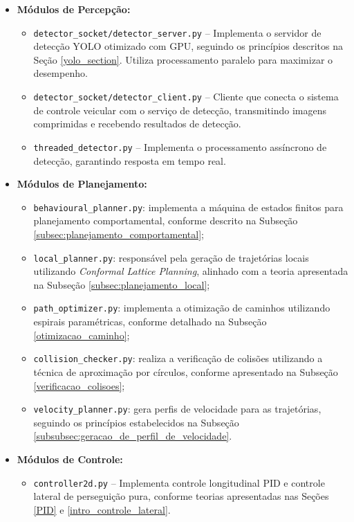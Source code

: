 \begin{itemize}
    \item \textbf{Módulos de Percepção:}
    \begin{itemize}
        \item \texttt{detector\_socket/detector\_server.py} – Implementa o servidor de detecção YOLO otimizado com GPU, seguindo os princípios descritos na Seção \ref{yolo_section}. Utiliza processamento paralelo para maximizar o desempenho.
        
        \item \texttt{detector\_socket/detector\_client.py} – Cliente que conecta o sistema de controle veicular com o serviço de detecção, transmitindo imagens comprimidas e recebendo resultados de detecção.
        
        \item \texttt{threaded\_detector.py} – Implementa o processamento assíncrono de detecção, garantindo resposta em tempo real.
    \end{itemize}
    
    \item \textbf{Módulos de Planejamento:}
    \begin{itemize}
        \item \texttt{behavioural\_planner.py}: implementa a máquina de estados finitos para planejamento comportamental, conforme descrito na Subseção \ref{subsec:planejamento_comportamental};
        \item \texttt{local\_planner.py}: responsável pela geração de trajetórias locais utilizando \textit{Conformal Lattice Planning}, alinhado com a teoria apresentada na Subseção \ref{subsec:planejamento_local};
        \item \texttt{path\_optimizer.py}: implementa a otimização de caminhos utilizando espirais paramétricas, conforme detalhado na Subseção \ref{otimizacao_caminho};
        \item \texttt{collision\_checker.py}: realiza a verificação de colisões utilizando a técnica de aproximação por círculos, conforme apresentado na Subseção \ref{verificacao_colisoes};
        \item \texttt{velocity\_planner.py}: gera perfis de velocidade para as trajetórias, seguindo os princípios estabelecidos na Subseção \ref{subsubsec:geracao_de_perfil_de_velocidade}.
    \end{itemize}
    
    \item \textbf{Módulos de Controle:}
    \begin{itemize}
        \item \texttt{controller2d.py} – Implementa controle longitudinal PID e controle lateral de perseguição pura, conforme teorias apresentadas nas Seções \ref{PID} e \ref{intro_controle_lateral}.
    \end{itemize}
    

\end{itemize}
